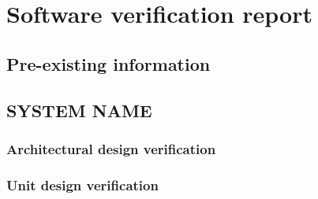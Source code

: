 \section{Software verification report}
%
%

\subsection{Pre-existing information}
%

\subsection{SYSTEM NAME}
\subsubsection{Architectural design verification}
%
%
%

\subsubsection{Unit design verification}
%
%
%
%


